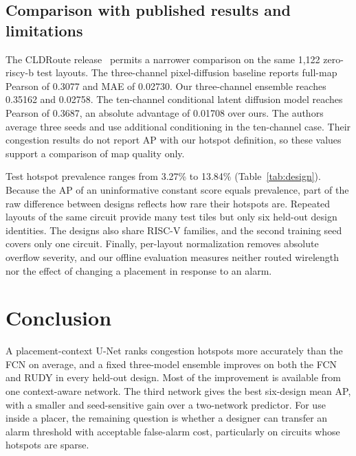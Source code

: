 \IfFileExists{./ieeeconf.cls}{\documentclass[9pt]{ieeeconf}}{\documentclass[conference]{IEEEtran}\usepackage[T1]{fontenc}}
\begin{document}
\subsection{Comparison with published results and limitations}
The CLDRoute release~\cite{thorat2026cldroute} permits a narrower comparison on the same 1,122 zero-riscy-b test layouts. The three-channel pixel-diffusion baseline reports full-map Pearson of 0.3077 and MAE of 0.02730. Our three-channel ensemble reaches 0.35162 and 0.02758. The ten-channel conditional latent diffusion model reaches Pearson of 0.3687, an absolute advantage of 0.01708 over ours. The authors average three seeds and use additional conditioning in the ten-channel case. Their congestion results do not report AP with our hotspot definition, so these values support a comparison of map quality only.

Test hotspot prevalence ranges from 3.27\% to 13.84\% (Table~\ref{tab:design}). Because the AP of an uninformative constant score equals prevalence, part of the raw difference between designs reflects how rare their hotspots are. Repeated layouts of the same circuit provide many test tiles but only six held-out design identities. The designs also share RISC-V families, and the second training seed covers only one circuit. Finally, per-layout normalization removes absolute overflow severity, and our offline evaluation measures neither routed wirelength nor the effect of changing a placement in response to an alarm.

\clearpage
\section{Conclusion}
A placement-context U-Net ranks congestion hotspots more accurately than the FCN on average, and a fixed three-model ensemble improves on both the FCN and RUDY in every held-out design. Most of the improvement is available from one context-aware network. The third network gives the best six-design mean AP, with a smaller and seed-sensitive gain over a two-network predictor. For use inside a placer, the remaining question is whether a designer can transfer an alarm threshold with acceptable false-alarm cost, particularly on circuits whose hotspots are sparse.



\end{document}
